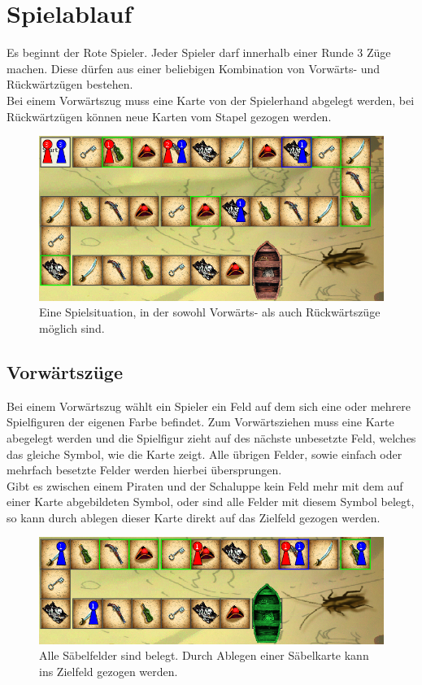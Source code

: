 \documentclass{scrartcl}
\begin{document}
\section{Spielablauf}
	Es beginnt der Rote Spieler. Jeder Spieler darf innerhalb einer Runde 3 Züge
	machen. Diese dürfen aus einer beliebigen Kombination von Vorwärts- und
	Rückwärtzügen bestehen.\\
	Bei einem Vorwärtszug muss eine Karte von der Spielerhand abgelegt werden, bei
	Rückwärtzügen können neue Karten vom Stapel gezogen werden.
	
	\begin{figure}[h]
		\label{fig:PossibleMoves}
		\centering
		\includegraphics[width=\linewidth]{bilder/Moves}
		\caption{Eine Spielsituation, in der sowohl Vorwärts- als auch Rückwärtszüge
		möglich sind.}
	\end{figure}
	\subsection{Vorwärtszüge}
	Bei einem Vorwärtszug wählt ein Spieler ein Feld auf dem sich eine oder mehrere
	Spielfiguren der eigenen Farbe befindet. Zum Vorwärtsziehen muss eine Karte
	abegelegt werden und die Spielfigur zieht auf des nächste unbesetzte Feld,
	welches das gleiche Symbol, wie die Karte zeigt. Alle übrigen Felder, sowie
	einfach oder mehrfach besetzte Felder werden hierbei übersprungen.\\
	Gibt es zwischen einem Piraten und der Schaluppe kein Feld mehr mit dem auf
	einer Karte abgebildeten Symbol, oder sind alle Felder mit diesem Symbol
	belegt, so kann durch ablegen dieser Karte direkt auf das Zielfeld gezogen werden.
	\begin{figure}[h]
		\centering
		\label{fig:Zielfeld}
		\includegraphics[width=\linewidth]{bilder/zielfeld}
		\caption{Alle Säbelfelder sind belegt. Durch Ablegen einer Säbelkarte kann
		ins Zielfeld gezogen werden.}
	\end{figure}
\end{document}

